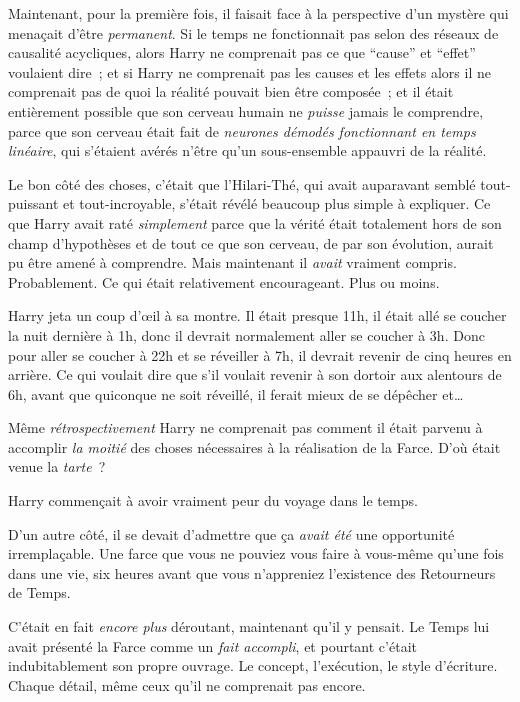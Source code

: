 Maintenant, pour la première fois, il faisait face à la perspective d'un mystère qui menaçait d'être \emph{permanent}. Si le temps ne fonctionnait pas selon des réseaux de causalité acycliques, alors Harry ne comprenait pas ce que “cause” et “effet” voulaient dire~; et si Harry ne comprenait pas les causes et les effets alors il ne comprenait pas de quoi la réalité pouvait bien être composée~; et il était entièrement possible que son cerveau humain ne \emph{puisse} jamais le comprendre, parce que son cerveau était fait de \emph{neurones démodés fonctionnant en temps linéaire}, qui s'étaient avérés n'être qu'un sous-ensemble appauvri de la réalité.

Le bon côté des choses, c'était que l'Hilari-Thé, qui avait auparavant semblé tout-puissant et tout-incroyable, s'était révélé beaucoup plus simple à expliquer. Ce que Harry avait raté \emph{simplement} parce que la vérité était totalement hors de son champ d'hypothèses et de tout ce que son cerveau, de par son évolution, aurait pu être amené à comprendre. Mais maintenant il \emph{avait} vraiment compris. Probablement. Ce qui était relativement encourageant. Plus ou moins.

Harry jeta un coup d'œil à sa montre. Il était presque 11h, il était allé se coucher la nuit dernière à 1h, donc il devrait normalement aller se coucher à 3h. Donc pour aller se coucher à 22h et se réveiller à 7h, il devrait revenir de cinq heures en arrière. Ce qui voulait dire que s'il voulait revenir à son dortoir aux alentours de 6h, avant que quiconque ne soit réveillé, il ferait mieux de se dépêcher et…

Même \emph{rétrospectivement} Harry ne comprenait pas comment il était parvenu à accomplir \emph{la moitié} des choses nécessaires à la réalisation de la Farce. D'où était venue la \emph{tarte}~?

Harry commençait à avoir vraiment peur du voyage dans le temps.

D'un autre côté, il se devait d'admettre que ça \emph{avait été} une opportunité irremplaçable. Une farce que vous ne pouviez vous faire à vous-même qu'une fois dans une vie, six heures avant que vous n'appreniez l'existence des Retourneurs de Temps.

C'était en fait \emph{encore plus} déroutant, maintenant qu'il y pensait. Le Temps lui avait présenté la Farce comme un \emph{fait accompli}, et pourtant c'était indubitablement son propre ouvrage. Le concept, l'exécution, le style d'écriture. Chaque détail, même ceux qu'il ne comprenait pas encore.

